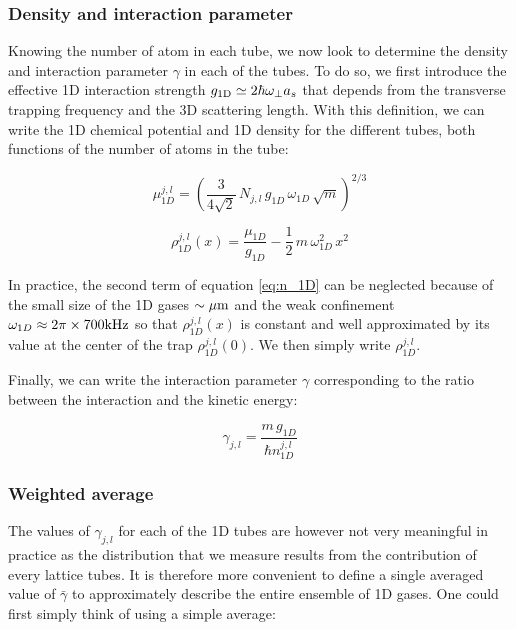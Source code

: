 \subsubsection{Density and interaction parameter}

Knowing the number of atom in each tube, we now look to determine the density and interaction parameter $\gamma$ in each of the tubes. To do so, we first introduce the effective 1D interaction strength $g_{\rm{1D}} \simeq 2 \hbar \omega_{\perp} a_s$ \cite{olshanii1998atomic} that depends from the transverse trapping frequency and the 3D scattering length. With this definition, we can write the 1D chemical potential and 1D density for the different tubes, both functions of the number of atoms in the tube:

\begin{equation}
    \mu_{1D}^{j,l} = \left( \frac{3}{4 \sqrt{2}} \, N_{j,l}\,  g_{1D} \, \omega_{1D}\,  \sqrt{m} \right)^{2/3}
\end{equation}

\begin{equation}\label{eq:n_1D}
    \rho_{1D}^{j,l}(x) = \frac{\mu_{1D}}{g_{1D}} - \frac{1}{2} \, m \, \omega_{1D}^2 \, x^2
\end{equation}

\noindent In practice, the second term of equation \ref{eq:n_1D} can be neglected because of the small size of the 1D gases $\sim \mu \rm{m}$ and the weak confinement $\omega_{1D} \approx 2 \pi \times 700 \rm{kHz}$ so that $\rho_{1D}^{j,l}(x)$ is constant and well approximated by its value at the center of the trap $\rho_{1D}^{j,l}(0)$. We then simply write $\rho_{1D}^{j,l}$.

Finally, we can write the interaction parameter $\gamma$ corresponding to the ratio between the interaction and the kinetic energy:

\begin{equation}
    \gamma_{j,l} = \frac{m \, g_{1D}}{\hbar n^{j,l}_{1D}} 
\end{equation}

\subsubsection{Weighted average}

\noindent The values of $\gamma_{j,l}$  for each of the 1D tubes are however not very meaningful in practice as the distribution that we measure results from the contribution of every lattice tubes. It is therefore more convenient to define a single averaged value of $\bar{\gamma}$ to approximately describe the entire ensemble of 1D gases. One could first simply think of using a simple average:

